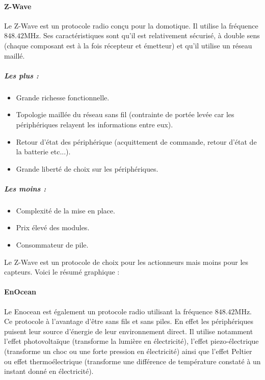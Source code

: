 \documentclass[a4paper,10pt]{article}
\begin{document}
\paragraph{Z-Wave}
Le Z-Wave est un protocole radio conçu pour la domotique. Il utilise la fréquence $848.42$MHz.
Ses caractéristiques sont qu'il est relativement sécurisé, à double sens (chaque composant est à la fois récepteur et émetteur) et qu'il utilise un réseau maillé.
\subparagraph{Les plus :}
\begin{itemize}
\item Grande richesse fonctionnelle.
\item Topologie maillée du réseau sans fil (contrainte de portée levée car les périphériques relayent les informations entre eux).
\item Retour d'état des périphérique (acquittement de commande, retour d'état de la batterie etc...).
\item Grande liberté de choix sur les périphériques.
\end{itemize}
\subparagraph{Les moins :}
\begin{itemize}
\item Complexité de la mise en place.
\item Prix élevé des modules.
\item Consommateur de pile.\newline
\end{itemize}
Le Z-Wave est un protocole de choix pour les actionneurs mais moins pour les capteurs. Voici le résumé graphique :


\paragraph{EnOcean}
Le Enocean est également un protocole radio utilisant la fréquence $848.42$MHz. Ce protocole à l'avantage d'être sans fils et sans piles. En effet les périphériques puisent leur source d'énergie de leur environnement direct. Il utilise notamment l'effet photovoltaïque (transforme la lumière en électricité), l'effet piezo-électrique (transforme un choc ou une forte pression en électricité) ainsi que l’effet Peltier ou effet thermoélectrique (transforme une différence de température constaté à un instant donné en électricité).
\end{document}
